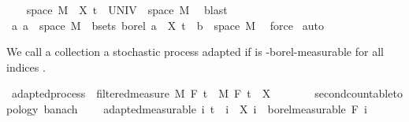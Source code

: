 \begin{isabellebody}
\ \ \isamarkupfalse%
\ {\isachardoublequoteopen}space\ M\ {\isacharequal}{\kern0pt}\ X\ t\ {\isacharminus}{\kern0pt}{\isacharbackquote}{\kern0pt}\ UNIV\ {\isasyminter}\ space\ M{\isachardoublequoteclose}\ \isamarkupfalse%
\ blast\isanewline
\ \ \isamarkupfalse%
\ {\isachardoublequoteopen}{\isasymAnd}a{\isachardot}{\kern0pt}\ a\ {\isasymin}\ {\isacharbraceleft}{\kern0pt}space\ M{\isacharbraceright}{\kern0pt}\ {\isasymLongrightarrow}\ {\isasymexists}b{\isasymin}sets\ borel{\isachardot}{\kern0pt}\ a\ {\isacharequal}{\kern0pt}\ X\ t\ {\isacharminus}{\kern0pt}{\isacharbackquote}{\kern0pt}\ b\ {\isasyminter}\ space\ M{\isachardoublequoteclose}\ \isamarkupfalse%
\ force\isanewline
{}\isamarkupfalse%
\ {\isacharparenleft}{\kern0pt}auto{\isacharparenright}{\kern0pt}%
\endisatagproof
{\isafoldproof}%
%
\isadelimproof
%
\endisadelimproof
%
\isadelimdocument
%
\endisadelimdocument
%
\isatagdocument
%
\isamarkuptrue%
%
\endisatagdocument
{\isafolddocument}%
%
\isadelimdocument
%
\endisadelimdocument
%
\begin{isamarkuptext}%
We call a collection a stochastic process  adapted if  is -borel-measurable for all indices .%
\end{isamarkuptext}\isamarkuptrue%
\isamarkupfalse%
\ adapted{\isacharunderscore}{\kern0pt}process\ {\isacharequal}{\kern0pt}\ filtered{\isacharunderscore}{\kern0pt}measure\ M\ F\ t\ \ M\ F\ t\ \ X\ {\isacharcolon}{\kern0pt}{\isacharcolon}{\kern0pt}\ {\isachardoublequoteopen}{\isacharunderscore}{\kern0pt}\ {\isasymRightarrow}\ {\isacharunderscore}{\kern0pt}\ {\isasymRightarrow}\ {\isacharunderscore}{\kern0pt}\ {\isacharcolon}{\kern0pt}{\isacharcolon}{\kern0pt}\ {\isacharbraceleft}{\kern0pt}second{\isacharunderscore}{\kern0pt}countable{\isacharunderscore}{\kern0pt}topology{\isacharcomma}{\kern0pt}\ banach{\isacharbraceright}{\kern0pt}{\isachardoublequoteclose}\ {\isacharplus}{\kern0pt}\isanewline
\ \ \ adapted{\isacharbrackleft}{\kern0pt}measurable{\isacharbrackright}{\kern0pt}{\isacharcolon}{\kern0pt}\ {\isachardoublequoteopen}{\isasymAnd}i{\isachardot}{\kern0pt}\ t\ {\isasymle}\ i\ {\isasymLongrightarrow}\ X\ i\ {\isasymin}\ borel{\isacharunderscore}{\kern0pt}measurable\ {\isacharparenleft}{\kern0pt}F\ i{\isacharparenright}{\kern0pt}{\isachardoublequoteclose}\isanewline

\end{isabellebody}
